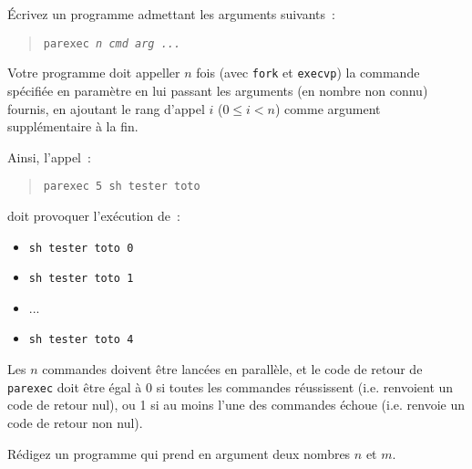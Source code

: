 Écrivez un programme admettant les arguments suivants~:

\begin {quote}
    \texttt {parexec \textit {n cmd arg ...}}
\end {quote}

Votre programme doit appeller $n$ fois (avec \texttt {fork} et \texttt
{execvp}) la commande spécifiée en paramètre en lui passant les
arguments (en nombre non connu) fournis, en ajoutant le rang d'appel $i$
($0 \leq i < n$) comme argument supplémentaire à la fin.

Ainsi, l'appel~:

\begin {quote}
    \texttt {parexec 5 sh tester toto}
\end {quote}

doit provoquer l'exécution de~:

\begin {itemize}
    \item \texttt {sh tester toto 0}
    \item \texttt {sh tester toto 1}
    \item ...
    \item \texttt {sh tester toto 4}
\end {itemize}

Les $n$ commandes doivent être lancées en parallèle, et le code de
retour de \texttt {parexec} doit être égal à 0 si toutes les commandes
réussissent (i.e. renvoient un code de retour nul), ou 1 si au moins
l'une des commandes échoue (i.e. renvoie un code de retour non nul).


\question

Rédigez un programme qui prend en argument deux nombres $n$ et $m$.

